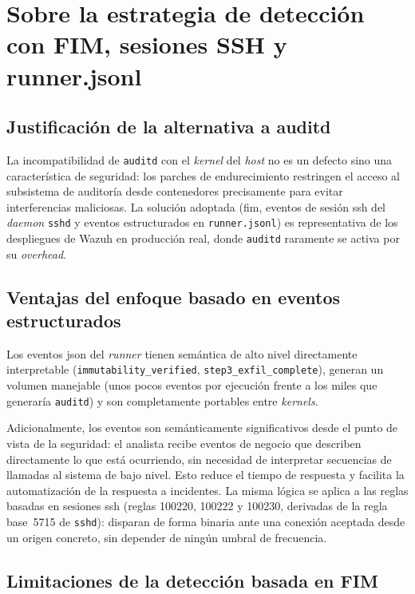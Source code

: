 \documentclass[../main.tex]{subfiles}
\begin{document}
\section{Sobre la estrategia de detección con FIM, sesiones SSH y runner.jsonl}

\subsection{Justificación de la alternativa a auditd}

La incompatibilidad de \texttt{auditd} con el \emph{kernel} del \emph{host} no es
un defecto sino una característica de seguridad: los parches de endurecimiento
restringen el acceso al subsistema de auditoría desde contenedores precisamente
para evitar interferencias maliciosas. La solución adoptada (\gls{fim}, eventos
de sesión \gls{ssh} del \emph{daemon} \texttt{sshd} y eventos estructurados en
\texttt{runner.jsonl}) es representativa de los despliegues de Wazuh en
producción real, donde \texttt{auditd} raramente se activa por su \emph{overhead}.

\subsection{Ventajas del enfoque basado en eventos estructurados}
\label{sec:ventajas-runner}

Los eventos \gls{json} del \emph{runner} tienen semántica de alto nivel
directamente interpretable
(\mbox{\texttt{immutability\_verified}},
\mbox{\texttt{step3\_exfil\_complete}}),
generan un volumen manejable (unos pocos eventos por ejecución frente a los miles
que generaría \texttt{auditd}) y son completamente portables entre \emph{kernels}.

Adicionalmente, los eventos son semánticamente significativos desde el punto de
vista de la seguridad: el analista recibe eventos de negocio que describen
directamente lo que está ocurriendo, sin necesidad de interpretar secuencias de
llamadas al sistema de bajo nivel. Esto reduce el tiempo de respuesta y facilita
la automatización de la respuesta a incidentes. La misma lógica se aplica a las
reglas basadas en sesiones \gls{ssh} (reglas 100220, 100222 y 100230, derivadas de
la regla base~5715 de \texttt{sshd}): disparan de forma binaria ante una conexión
aceptada desde un origen concreto, sin depender de ningún umbral de frecuencia.

\subsection{Limitaciones de la detección basada en FIM}
\end{document}
